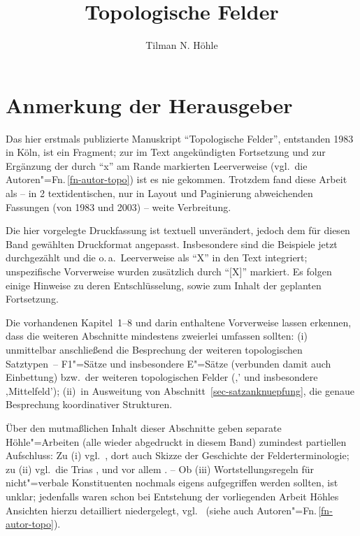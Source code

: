 \documentclass[output=paper]{langsci/langscibook}
\author{Tilman N. Höhle}
\title{Topologische Felder}
\begin{document}

\setcounter{tocdepth}{3}
\localtableofcontents

\newpage

\section*{Anmerkung der Herausgeber}
\label{fn-herausgeber-topo}

Das hier erstmals publizierte Manuskript "`Topologische Felder"', entstanden 1983 in Köln, ist ein
Fragment; zur im Text angekündigten Fortsetzung und zur Ergänzung der durch "`x"' am Rande
markierten Leerverweise (vgl.\ die Autoren"=Fn.\,\ref{fn-autor-topo}) ist es nie gekommen. Trotzdem
fand diese Arbeit als  -- in 2 textidentischen, nur in Layout und Paginierung
abweichenden Fassungen (von 1983 und 2003) -- weite Verbreitung.

Die hier vorgelegte Druckfassung ist textuell unverändert, jedoch dem für diesen Band gewählten
Druckformat angepasst. Insbesondere sind die Beispiele jetzt durchgezählt und die
o.\,a.\ Leerverweise als "`X"' in den Text integriert; unspezifische Vorverweise wurden zusätzlich
durch "`[X]"' markiert. Es folgen einige Hinweise zu deren
Entschlüsselung, sowie zum Inhalt der geplanten Fortsetzung.

Die vorhandenen Kapitel~1--8 und darin enthaltene Vorverweise lassen erkennen, dass die weiteren
Abschnitte mindestens zweierlei umfassen sollten: (i) unmittelbar anschließend die Besprechung der
weiteren topologischen Satztypen~-- F1"=Sätze und insbesondere E"=Sätze (verbunden damit auch
Einbettung) bzw.\ der weiteren topologischen Felder (‚’ und insbesondere ‚Mittelfeld’); (ii)~in Ausweitung von Abschnitt~\ref{sec-satzanknuepfung}, die genaue Besprechung koordinativer Strukturen.

Über den mutmaßlichen Inhalt dieser Abschnitte geben separate Höhle"=Arbeiten (alle wieder abgedruckt in diesem Band) zumindest partiellen Aufschluss: Zu (i)
vgl.\ \citet{Hoehle86}, dort auch Skizze der Geschichte der Felderterminologie; zu (ii) vgl.\ die
Trias \citet{Hoehle1983}, \citet{Hoehle90a} und vor allem \citet{Hoehle91}. -- Ob (iii)
Wortstellungsregeln für nicht"=verbale Konstituenten nochmals eigens aufgegriffen werden sollten,
ist unklar; jedenfalls waren schon bei Entstehung der vorliegenden Arbeit Höhles Ansichten hierzu
detailliert niedergelegt, vgl.\ \citet{Hoehle1982} (siehe auch Autoren"=Fn.\,\ref{fn-autor-topo}). 
\end{document}

